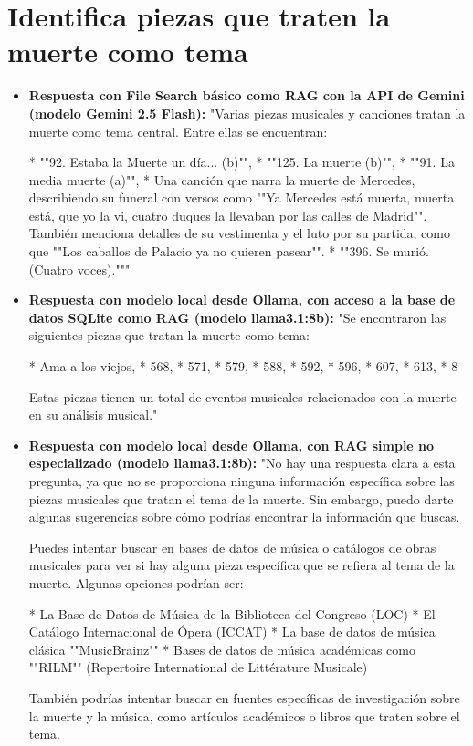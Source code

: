\section{Identifica piezas que traten la muerte como tema}
\begin{itemize}
    \item \textbf{Respuesta con File Search básico como RAG con la API de Gemini (modelo Gemini 2.5 Flash):} "Varias piezas musicales y canciones tratan la muerte como tema central. Entre ellas se encuentran:

*   ""92. Estaba la Muerte un día... (b)"",
*   ""125. La muerte (b)"",
*   ""91. La media muerte (a)"",
*   Una canción que narra la muerte de Mercedes, describiendo su funeral con versos como ""Ya Mercedes está muerta, muerta está, que yo la vi, cuatro duques la llevaban por las calles de Madrid"". También menciona detalles de su vestimenta y el luto por su partida, como que ""Los caballos de Palacio ya no quieren pasear"".
*   ""396. Se murió. (Cuatro voces)."""
    \item \textbf{Respuesta con modelo local desde Ollama, con acceso a la base de datos SQLite como RAG (modelo llama3.1:8b):} "Se encontraron las siguientes piezas que tratan la muerte como tema:

* Ama a los viejos,
* 568,
* 571,
* 579,
* 588,
* 592,
* 596,
* 607,
* 613,
* 8

Estas piezas tienen un total de eventos musicales relacionados con la muerte en su análisis musical."
\item \textbf{Respuesta con modelo local desde Ollama, con RAG simple no especializado (modelo llama3.1:8b):} "No hay una respuesta clara a esta pregunta, ya que no se proporciona ninguna información específica sobre las piezas musicales que tratan el tema de la muerte. Sin embargo, puedo darte algunas sugerencias sobre cómo podrías encontrar la información que buscas.

Puedes intentar buscar en bases de datos de música o catálogos de obras musicales para ver si hay alguna pieza específica que se refiera al tema de la muerte. Algunas opciones podrían ser:

* La Base de Datos de Música de la Biblioteca del Congreso (LOC)
* El Catálogo Internacional de Ópera (ICCAT)
* La base de datos de música clásica ""MusicBrainz""
* Bases de datos de música académicas como ""RILM"" (Repertoire International de Littérature Musicale)

También podrías intentar buscar en fuentes específicas de investigación sobre la muerte y la música, como artículos académicos o libros que traten sobre el tema.


\end{itemize}
